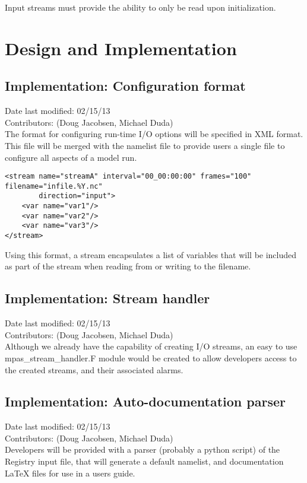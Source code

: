 \documentclass[11pt]{report}
\begin{document}
Input streams must provide the ability to only be read upon initialization.


\chapter{Design and Implementation}

\section{Implementation: Configuration format}
Date last modified: 02/15/13 \\
Contributors: (Doug Jacobsen, Michael Duda) \\

The format for configuring run-time I/O options will be specified in XML
format. This file will be merged with the namelist file to provide users a
single file to configure all aspects of a model run.

\begin{lstlisting}
<stream name="streamA" interval="00_00:00:00" frames="100" filename="infile.%Y.nc"
        direction="input">
	<var name="var1"/>
	<var name="var2"/>
	<var name="var3"/>
</stream>
\end{lstlisting}

Using this format, a stream encapsulates a list of variables that will be
included as part of the stream when reading from or writing to the filename.

\section{Implementation: Stream handler}
Date last modified: 02/15/13 \\
Contributors: (Doug Jacobsen, Michael Duda) \\

Although we already have the capability of creating I/O streams, an easy to use
mpas\_stream\_handler.F module would be created to allow developers access to
the created streams, and their associated alarms.

\section{Implementation: Auto-documentation parser}
Date last modified: 02/15/13 \\
Contributors: (Doug Jacobsen, Michael Duda) \\

Developers will be provided with a parser (probably a python script) of the
Registry input file, that will generate a default namelist, and documentation
LaTeX files for use in a users guide.
\end{document}

